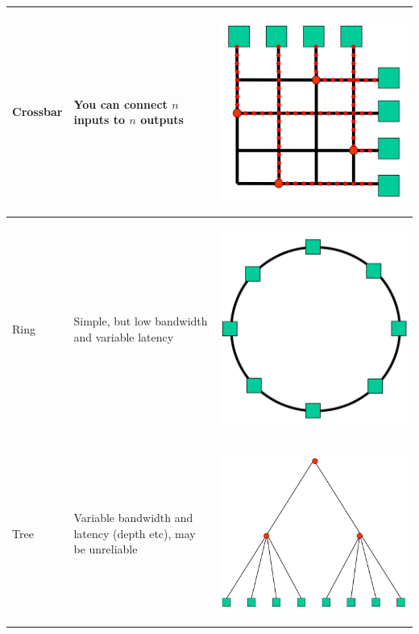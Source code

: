 \begin{center}
  \begin{tabular}{| m{2cm} | m{5cm} | c |}
    \hline
    Crossbar & You can connect $n$ inputs to $n$ outputs & 
    \begin{minipage}{.3\textwidth}
      \begin{center}
        \includegraphics[width=0.5\linewidth]{images/crossbar}
      \end{center}
    \end{minipage} \\ \hline
    Ring & Simple, but low bandwidth and variable latency & 
    \begin{minipage}{.3\textwidth}
      \begin{center}
        \includegraphics[width=0.5\linewidth]{images/ring}
      \end{center}
    \end{minipage} \\ \hline
    Tree & Variable bandwidth and latency (depth etc), may be unreliable & 
    \begin{minipage}{.3\textwidth}
      \begin{center}
        \includegraphics[width=0.5\linewidth]{images/tree}

\end{center}
\end{minipage}
\end{tabular}
\end{center}
